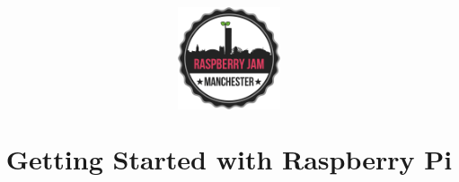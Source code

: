 \documentclass[a4paper, twocolumn, twoside, 11pt]{article}
\begin{document}
	\author{}
	\title{
		\begin{center}
			\includegraphics[width=30mm]{common/logo-512}
		\end{center}
		\vspace{12pt}
		Getting Started with Raspberry Pi}
	\date{}
	\maketitle
	
	
	\setcounter{tocdepth}{1}
	\tableofcontents
	\vspace{12pt}

	
	
	\newpage
	
	\newpage
	
	\newpage
	
\end{document}
